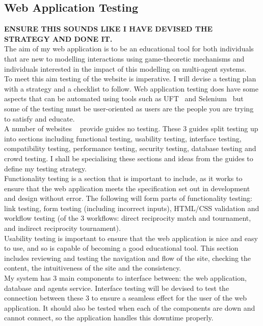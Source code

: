 \documentclass[]{final_report}
\begin{document}
\subsection{Web Application Testing}
\textbf{ENSURE THIS SOUNDS LIKE I HAVE DEVISED THE STRATEGY AND DONE IT.}\\
The aim of my web application is to be an educational tool for both individuals that are new to modelling interactions using game-theoretic mechanisms and individuals interested in the impact of this modelling on multi-agent systems.\\
To meet this aim testing of the website is imperative. I will devise a testing plan with a strategy and a checklist to follow. Web application testing does have some aspects that can be automated using tools such as UFT~\cite{uft} and Selenium~\cite{selenium} but some of the testing must be user-oriented as users are the people you are trying to satisfy and educate.\\
A number of websites ~\cite{software_testing_help,guru99_testing,tutorials_point_testing} provide guides no testing. These 3 guides split testing up into sections including functional testing, usability testing, interface testing, compatibility testing, performance testing, security testing, database testing and crowd testing. I shall be specialising these sections and ideas from the guides to define my testing strategy.\\
Functionality testing is a section that is important to include, as it works to ensure that the web application meets the specification set out in development and design without error. The following will form parts of functionality testing: link testing, form testing (including incorrect inputs), HTML/CSS validation and workflow testing (of the 3 workflows: direct reciprocity match and tournament, and indirect reciprocity tournament).\\
Usability testing is important to ensure that the web application is nice and easy to use, and so is capable of becoming a good educational tool. This section includes reviewing and testing the navigation and flow of the site, checking the content, the intuitiveness of the site and the consistency.\\
My system has 3 main components to interface between: the web application, database and agents service. Interface testing will be devised to test the connection between these 3 to ensure a seamless effect for the user of the web application. It should also be tested when each of the components are down and cannot connect, so the application handles this downtime properly.\\
\end{document}
